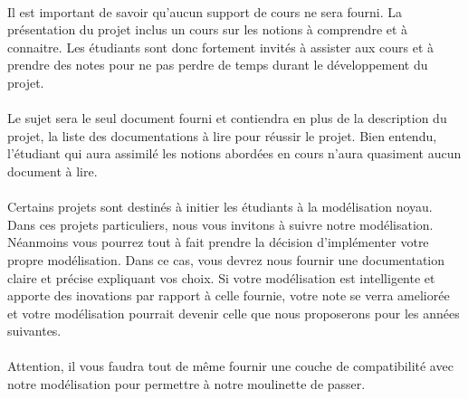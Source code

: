\documentclass[10pt,a4wide]{article}
\begin{document}
\paragraph{}

Il est important de savoir qu'aucun support de cours ne sera fourni. La
pr\'esentation du projet inclus un cours sur les notions \`a comprendre
et \`a connaitre. Les \'etudiants sont donc fortement invit\'es \`a
assister aux cours et \`a prendre des notes pour ne pas perdre de temps
durant le d\'eveloppement du projet.

\paragraph{}

Le sujet sera le seul document fourni et contiendra en plus de la description
du projet, la liste des documentations \`a lire pour r\'eussir le projet.
Bien entendu, l'\'etudiant qui aura assimil\'e les notions abord\'ees en
cours n'aura quasiment aucun document \`a lire.

\paragraph{}

Certains projets sont destin\'es \`a initier les \'etudiants \`a la
mod\'elisation noyau. Dans ces projets particuliers, nous
vous invitons \`a suivre notre mod\'elisation. N\'eanmoins vous
pourrez tout \`a fait prendre la d\'ecision d'impl\'ementer votre
propre mod\'elisation. Dans ce cas, vous devrez nous fournir une documentation
claire et pr\'ecise expliquant vos choix. Si votre mod\'elisation est
intelligente et apporte des inovations par rapport \`a celle fournie,
votre note se verra amelior\'ee et votre mod\'elisation pourrait devenir
celle que nous proposerons pour les ann\'ees suivantes.

\paragraph{}

Attention, il vous faudra tout de m\^eme fournir une couche de compatibilit\'e
avec notre mod\'elisation pour permettre \`a notre moulinette de passer.
\end{document}
